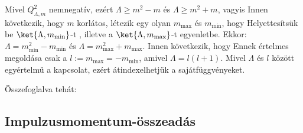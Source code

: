    Mivel $Q^2_{\Lambda,m}$ nemnegatív, ezért $\Lambda\geq m^2-m$ és $\Lambda\geq m^2+m$, vagyis 
   Innen következik, hogy $m$ korlátos, létezik egy olyan $m_\text{max}$ és $m_\text{min}$, hogy 
   Helyettesítsük be $\ket{\Lambda,m_\text{min}}$-t , illetve a $\ket{\Lambda,m_\text{max}}$-t  egyenletbe.
   Ekkor: $\Lambda=m_\text{min}^2-m_\text{min}$ és $\Lambda=m_\text{max}^2+m_\text{max}$.
   Innen következik, hogy 
   Ennek értelmes megoldása csak a $l:=m_\text{max}=-m_\text{min}$, amivel $\Lambda=l(l+1)$.
   Mivel $\Lambda$ és $l$ között egyértelmű a kapcsolat, ezért átindexelhetjük a sajátfüggvényeket.
   
   Összefoglalva tehát:
   \\[6pt]
   
  \subsection{Impulzusmomentum-összeadás}
   
